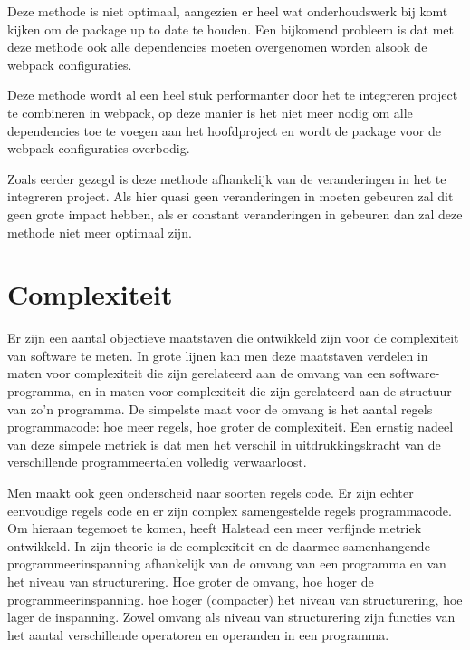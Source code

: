 Deze methode is niet optimaal, aangezien er heel wat onderhoudswerk bij komt kijken om de package up to date te houden. Een bijkomend probleem is dat met deze methode ook alle dependencies moeten overgenomen worden alsook de webpack configuraties. 

Deze methode wordt al een heel stuk performanter door het te integreren project te combineren in webpack, op deze manier is het niet meer nodig om alle dependencies toe te voegen aan het hoofdproject en wordt de package voor de webpack configuraties overbodig. 

Zoals eerder gezegd is deze methode afhankelijk van de veranderingen in het te integreren project. Als hier quasi geen veranderingen in moeten gebeuren zal dit geen grote impact hebben, als er constant veranderingen in gebeuren dan zal deze methode niet meer optimaal zijn. 

\section{Complexiteit}
Er zijn een aantal objectieve maatstaven die ontwikkeld zijn voor de complexiteit van software te meten. In grote lijnen kan men deze maatstaven verdelen in maten voor complexiteit die zijn gerelateerd aan de omvang van een software-programma, en in maten voor complexiteit die zijn gerelateerd aan de structuur van zo'n programma. De simpelste maat voor de omvang is het aantal regels programmacode: hoe meer regels, hoe groter de complexiteit. Een ernstig nadeel van deze simpele metriek is dat men het verschil in uitdrukkingskracht van de verschillende programmeertalen volledig verwaarloost.

Men maakt ook geen onderscheid naar soorten regels code. Er zijn echter eenvoudige regels code en er zijn complex samengestelde regels programmacode. Om hieraan tegemoet te komen, heeft Halstead een meer verfijnde metriek ontwikkeld. In zijn theorie is de complexiteit en de daarmee samenhangende programmeerinspanning afhankelijk van de omvang van een programma en van het niveau van structurering. Hoe groter de omvang, hoe hoger de programmeerinspanning. hoe hoger (compacter) het niveau van structurering, hoe lager de inspanning. Zowel omvang als niveau van structurering zijn functies van het aantal verschillende operatoren en operanden in een programma.
\autocite{complexiteit01}

